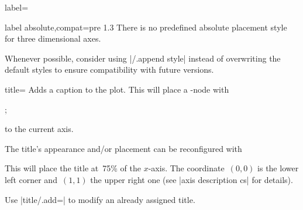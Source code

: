 \begin{pgfplotsxykey}{\x label=}
\begin{pgfplotsxykeylist}{\x label absolute,compat=pre 1.3}
	There is no predefined absolute placement style for three dimensional axes.
\end{pgfplotsxykeylist}

Whenever possible, consider using |/.append style| instead of overwriting the default styles to ensure compatibility with future versions.
\begin{codeexample}
\end{codeexample}
\end{pgfplotsxykey}

\begin{pgfplotskey}{title=}
Adds a caption to the plot. This will place a \Tikz-node with
\begin{codeexample}
;
\end{codeexample}
to the current axis.
\begin{codeexample}[]
%
\end{codeexample}
% 
The title's appearance and/or placement can be reconfigured with
\begin{codeexample}
\end{codeexample}
This will place the title at~75\% of the $x$-axis. The coordinate~$(0,0)$ is the lower left corner and~$(1,1)$ the upper right one (see |axis description cs| for details).

Use |title/.add=| to modify an already assigned title.
\end{pgfplotskey}

